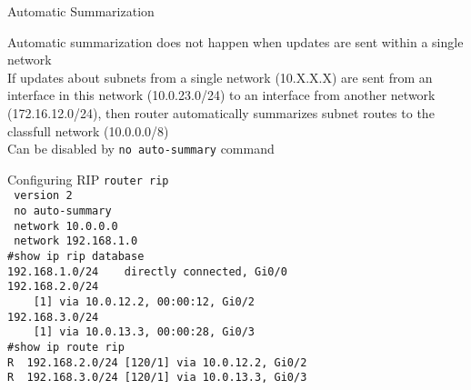 \begin{frame}{Automatic Summarization}
	\vspace{0.2cm}
	\pause\pause Automatic summarization does not happen when updates are sent within a single network\\\vspace{0.2cm}
	\pause\pause\pause If updates about subnets from a single network (10.X.X.X) \pause are sent from an interface in this network (10.0.23.0/24) \pause to an interface from another network (172.16.12.0/24)\pause, then router automatically summarizes subnet routes to the classfull network (10.0.0.0/8)\\\vspace{0.2cm}
	\onslide<14->Can be disabled by \texttt{no auto-summary} command
\end{frame}

\begin{frame}{Configuring RIP}
	\texttt{router rip
		  \\~version 2
		  \\~no auto-summary
		  \\~network 10.0.0.0
		  \\~network 192.168.1.0
		  \vspace{0.3cm}
	\pause\\\#show ip rip database
		  \\192.168.1.0/24~~~~directly connected, Gi0/0
		  \\192.168.2.0/24
		  \\~~~~[1] via 10.0.12.2, 00:00:12, Gi0/2
		  \\192.168.3.0/24
		  \\~~~~[1] via 10.0.13.3, 00:00:28, Gi0/3
		  \vspace{0.3cm}
	\pause\\\#show ip route rip
		  \\R~~192.168.2.0/24 [120/1] via 10.0.12.2, Gi0/2
		  \\R~~192.168.3.0/24 [120/1] via 10.0.13.3, Gi0/3}
\end{frame}

